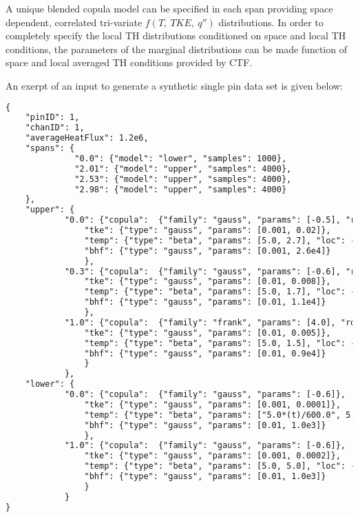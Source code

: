 A unique blended copula model can be specified in each span providing space dependent, correlated tri-variate $f(T,\ TKE,\ q'')$  distributions.
In order to completely specify the local TH distributions conditioned on space and local TH conditions, the parameters of the marginal distributions can be made function of space and local averaged TH conditions provided by CTF.  

An exerpt of an input to generate a synthetic single pin data set is given below:
\tiny
\begin{lstlisting}[language=XML]
{
    "pinID": 1,
    "chanID": 1,
    "averageHeatFlux": 1.2e6,
    "spans": {
              "0.0": {"model": "lower", "samples": 1000},
              "2.01": {"model": "upper", "samples": 4000},
              "2.53": {"model": "upper", "samples": 4000},
              "2.98": {"model": "upper", "samples": 4000}
    },
    "upper": {
            "0.0": {"copula":  {"family": "gauss", "params": [-0.5], "rot": 0},
                "tke": {"type": "gauss", "params": [0.001, 0.02]},
                "temp": {"type": "beta", "params": [5.0, 2.7], "loc": -9.2, "scale": 12.0},
                "bhf": {"type": "gauss", "params": [0.001, 2.6e4]}
                },
            "0.3": {"copula":  {"family": "gauss", "params": [-0.6], "rot": 0},
                "tke": {"type": "gauss", "params": [0.01, 0.008]},
                "temp": {"type": "beta", "params": [5.0, 1.7], "loc": -7.0, "scale": 8.0},
                "bhf": {"type": "gauss", "params": [0.01, 1.1e4]}
                },
            "1.0": {"copula":  {"family": "frank", "params": [4.0], "rot": 1},
                "tke": {"type": "gauss", "params": [0.01, 0.005]},
                "temp": {"type": "beta", "params": [5.0, 1.5], "loc": -4.0, "scale": 5.0},
                "bhf": {"type": "gauss", "params": [0.01, 0.9e4]}
                }
            },
    "lower": {
            "0.0": {"copula":  {"family": "gauss", "params": [-0.6]},
                "tke": {"type": "gauss", "params": [0.001, 0.0001]},
                "temp": {"type": "beta", "params": ["5.0*(t)/600.0", 5.0], "loc": -2.0, "scale": 4.0},
                "bhf": {"type": "gauss", "params": [0.01, 1.0e3]}
                },
            "1.0": {"copula":  {"family": "gauss", "params": [-0.6]},
                "tke": {"type": "gauss", "params": [0.001, 0.0002]},
                "temp": {"type": "beta", "params": [5.0, 5.0], "loc": -2.0, "scale": 4.0},
                "bhf": {"type": "gauss", "params": [0.01, 1.0e3]}
                }
            }
}
\end{lstlisting}
\normalsize

